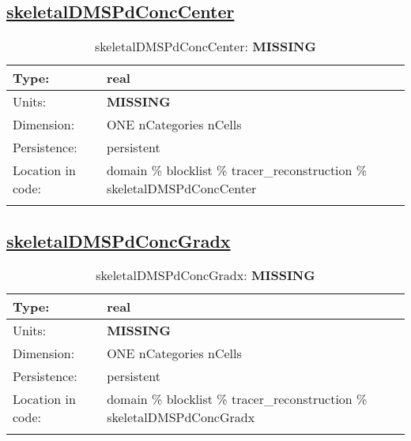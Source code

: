 \subsection[skeletalDMSPdConcCenter]{\hyperref[sec:var_tab_tracer_reconstruction]{skeletalDMSPdConcCenter}}
\label{subsec:var_sec_tracer_reconstruction_skeletalDMSPdConcCenter}
\begin{center}
\begin{longtable}{| p{2.0in} | p{4.0in} |}
        \hline 
        Type: & real \\
        \hline 
        Units: & {\bf \color{red} MISSING} \\
        \hline 
        Dimension: & ONE nCategories nCells \\
        \hline 
        Persistence: & persistent \\
        \hline 
         Location in code: & domain \% blocklist \% tracer\_reconstruction \% skeletalDMSPdConcCenter \\
         \hline 
    \caption{skeletalDMSPdConcCenter: {\bf \color{red} MISSING}}
\end{longtable}
\end{center}
\subsection[skeletalDMSPdConcGradx]{\hyperref[sec:var_tab_tracer_reconstruction]{skeletalDMSPdConcGradx}}
\label{subsec:var_sec_tracer_reconstruction_skeletalDMSPdConcGradx}
\begin{center}
\begin{longtable}{| p{2.0in} | p{4.0in} |}
        \hline 
        Type: & real \\
        \hline 
        Units: & {\bf \color{red} MISSING} \\
        \hline 
        Dimension: & ONE nCategories nCells \\
        \hline 
        Persistence: & persistent \\
        \hline 
         Location in code: & domain \% blocklist \% tracer\_reconstruction \% skeletalDMSPdConcGradx \\
         \hline 
    \caption{skeletalDMSPdConcGradx: {\bf \color{red} MISSING}}
\end{longtable}
\end{center}
